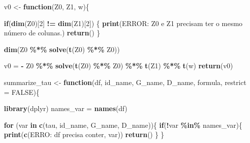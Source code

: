 \documentclass[portugues]{article}
\newenvironment{Shaded}{\begin{snugshade}}{\end{snugshade}}
\newcommand{\AttributeTok}[1]{\textcolor[rgb]{0.13,0.29,0.53}{#1}}
\newcommand{\ConstantTok}[1]{\textcolor[rgb]{0.56,0.35,0.01}{#1}}
\newcommand{\ControlFlowTok}[1]{\textcolor[rgb]{0.13,0.29,0.53}{\textbf{#1}}}
\newcommand{\DecValTok}[1]{\textcolor[rgb]{0.00,0.00,0.81}{#1}}
\newcommand{\FunctionTok}[1]{\textcolor[rgb]{0.13,0.29,0.53}{\textbf{#1}}}
\newcommand{\NormalTok}[1]{#1}
\newcommand{\OtherTok}[1]{\textcolor[rgb]{0.56,0.35,0.01}{#1}}
\newcommand{\SpecialCharTok}[1]{\textcolor[rgb]{0.81,0.36,0.00}{\textbf{#1}}}
\newcommand{\StringTok}[1]{\textcolor[rgb]{0.31,0.60,0.02}{#1}}
\begin{document}
\begin{box_code}

    \begin{Shaded}
    \begin{Highlighting}[]
    \NormalTok{v0 }\OtherTok{\textless{}{-}} \ControlFlowTok{function}\NormalTok{(Z0, Z1, w)\{}
      
      \ControlFlowTok{if}\NormalTok{(}\FunctionTok{dim}\NormalTok{(Z0)[}\DecValTok{2}\NormalTok{] }\SpecialCharTok{!=} \FunctionTok{dim}\NormalTok{(Z1)[}\DecValTok{2}\NormalTok{]) \{}
        \FunctionTok{print}\NormalTok{(}\StringTok{\textquotesingle{}ERROR: Z0 e Z1 precisam ter o mesmo número}
        \StringTok{\textquotesingle{}de colunas.\textquotesingle{}}\NormalTok{)}
        \FunctionTok{return}\NormalTok{(}\StringTok{\textquotesingle{}\textquotesingle{}}\NormalTok{)}
    \NormalTok{  \}}
    
      \FunctionTok{dim}\NormalTok{(Z0 }\SpecialCharTok{\%*\%} \FunctionTok{solve}\NormalTok{(}\FunctionTok{t}\NormalTok{(Z0) }\SpecialCharTok{\%*\%}\NormalTok{ Z0))}
      
    \NormalTok{  v0 }\OtherTok{=} \SpecialCharTok{{-}}\NormalTok{ Z0 }\SpecialCharTok{\%*\%} \FunctionTok{solve}\NormalTok{(}\FunctionTok{t}\NormalTok{(Z0) }\SpecialCharTok{\%*\%}\NormalTok{ Z0) }\SpecialCharTok{\%*\%} \FunctionTok{t}\NormalTok{(Z1) }\SpecialCharTok{\%*\%} \FunctionTok{t}\NormalTok{(w)}
      \FunctionTok{return}\NormalTok{(v0)}

    \end{Highlighting}
    \end{Shaded}
      
    \begin{Shaded}
    \begin{Highlighting}[]
    
    \NormalTok{summarize\_tau }\OtherTok{\textless{}{-}} \ControlFlowTok{function}\NormalTok{(df, id\_name, G\_name, D\_name, }
                \NormalTok{formula, }\AttributeTok{restrict =} \ConstantTok{FALSE}\NormalTok{)\{}
      
      \FunctionTok{library}\NormalTok{(dplyr)}
    \NormalTok{  names\_var }\OtherTok{=} \FunctionTok{names}\NormalTok{(df)}
    
      \ControlFlowTok{for}\NormalTok{ (var }\ControlFlowTok{in} \FunctionTok{c}\NormalTok{(}\StringTok{\textquotesingle{}tau\textquotesingle{}}\NormalTok{, id\_name, G\_name, D\_name))\{}
        \ControlFlowTok{if}\NormalTok{(}\SpecialCharTok{!}\NormalTok{var }\SpecialCharTok{\%in\%}\NormalTok{ names\_var)\{}
          \FunctionTok{print}\NormalTok{(}\FunctionTok{c}\NormalTok{(}\StringTok{\textquotesingle{}ERRO: df precisa conter\textquotesingle{}}\NormalTok{, var))}
          \FunctionTok{return}\NormalTok{(}\StringTok{\textquotesingle{}\textquotesingle{}}\NormalTok{)}
    \NormalTok{    \}}
    \NormalTok{  \}}
      

\end{Highlighting}
\end{Shaded}
\end{box_code}
\end{document}
